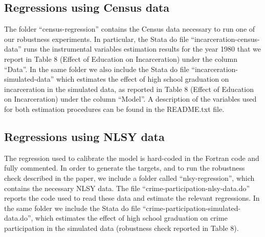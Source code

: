\documentclass[a4paper,dvips,12pt]{article}
\begin{document}
\subsection*{Regressions using Census data}
The folder ``census-regression'' contains the Census data necessary to run one of our robustness experiments. In particular, the Stata do file ``incarceration-census-data'' runs the instrumental variables estimation results for the year 1980 that we report in Table 8 (Effect of Education on Incarceration) under the column ``Data''.
In the same folder we also include the Stata do file ``incarceration-simulated-data'' which estimates the effect of high school graduation on incarceration in the simulated data, as reported in Table 8  (Effect of Education on Incarceration) under the column ``Model''.
A description of the variables used for both estimation procedures can be found in the README.txt file.

\subsection*{Regressions using NLSY data}
The regression used to calibrate the model is hard-coded in the Fortran code and fully commented. In order to generate the targets, and to run the robustness check described in the paper, we include a folder called ``nlsy-regression'', which contains the necessary NLSY data. The file ``crime-participation-nlsy-data.do'' reports the code used to read these data and estimate the relevant regressions.
In the same folder we include the Stata do file ``crime-participation-simulated-data.do'', which estimates the effect of high school graduation on crime participation in the simulated data (robustness check reported in Table 8).
\end{document}
